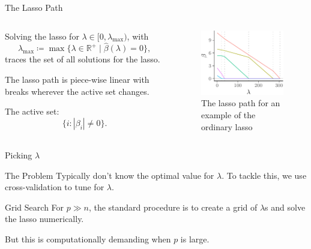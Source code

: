 \documentclass[10pt,ignorenonframetext]{beamer}
\begin{document}
\begin{frame}{The Lasso Path}
  \begin{columns}[T, onlytextwidth]
    \begin{column}{0.5\linewidth}

      Solving the lasso for \(\lambda \in [0, \lambda_\text{max})\), with
      \[\lambda_\text{max} \coloneqq \max \big\{ \lambda \in \mathbb{R}^+ \mid
        \hat\beta(\lambda) = 0\big\},\]
      traces the set of all solutions for the lasso. \medskip

      The lasso path is \alert{piece-wise linear} with breaks wherever the active set changes. \medskip

      \alert{The active set}: \[
        \{i : |\beta_i| \neq 0\}.
      \]


    \end{column}
    \begin{column}{0.5\linewidth}
      \begin{figure}
        \includegraphics{figures/lasso-path}
        \caption{The lasso path for an example of the ordinary lasso}
      \end{figure}
    \end{column}
  \end{columns}

\end{frame}

\begin{frame}{Picking \(\lambda\)}

  \begin{block}{The Problem}
    Typically don't know the optimal value for
    \(\lambda\). To tackle this, we use cross-validation to tune for
    \(\lambda\).
  \end{block}

  \pause

  \begin{block}{Grid Search}
    For \(p \gg n\), the standard procedure is to create a
    grid of \(\lambda\)s and solve the lasso numerically.
  \end{block}

  \medskip

  \pause

  But this is computationally demanding when \(p\) is large.

\end{frame}
\end{document}
